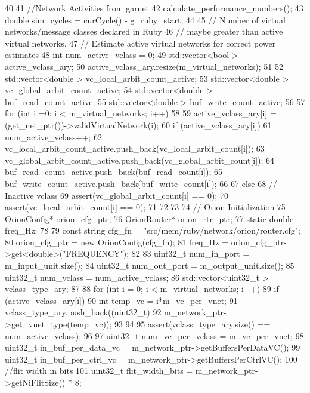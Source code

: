 \begin{DoxyCode}
40 {
41     //Network Activities from garnet
42     calculate_performance_numbers();
43     double sim_cycles = curCycle() - g_ruby_start;
44 
45     // Number of virtual networks/message classes declared in Ruby
46     // maybe greater than active virtual networks.
47     // Estimate active virtual networks for correct power estimates
48     int num_active_vclass = 0;
49     std::vector<bool > active_vclass_ary;
50     active_vclass_ary.resize(m_virtual_networks);
51 
52     std::vector<double > vc_local_arbit_count_active;
53     std::vector<double > vc_global_arbit_count_active;
54     std::vector<double > buf_read_count_active;
55     std::vector<double > buf_write_count_active;
56 
57     for (int i =0; i < m_virtual_networks; i++) {
58 
59         active_vclass_ary[i] = (get_net_ptr())->validVirtualNetwork(i);
60         if (active_vclass_ary[i]) {
61             num_active_vclass++;
62             vc_local_arbit_count_active.push_back(vc_local_arbit_count[i]);
63             vc_global_arbit_count_active.push_back(vc_global_arbit_count[i]);
64             buf_read_count_active.push_back(buf_read_count[i]);
65             buf_write_count_active.push_back(buf_write_count[i]);
66         }
67         else {
68             // Inactive vclass
69             assert(vc_global_arbit_count[i] == 0);
70             assert(vc_local_arbit_count[i] == 0);
71         }
72     }
73 
74     // Orion Initialization
75     OrionConfig* orion_cfg_ptr;
76     OrionRouter* orion_rtr_ptr;
77     static double freq_Hz;
78 
79     const string cfg_fn = "src/mem/ruby/network/orion/router.cfg";
80     orion_cfg_ptr = new OrionConfig(cfg_fn);
81     freq_Hz = orion_cfg_ptr->get<double>("FREQUENCY");
82 
83     uint32_t num_in_port = m_input_unit.size();
84     uint32_t num_out_port = m_output_unit.size();
85     uint32_t num_vclass = num_active_vclass;
86     std::vector<uint32_t > vclass_type_ary;
87 
88     for (int i = 0; i < m_virtual_networks; i++) {
89         if (active_vclass_ary[i]) {
90             int temp_vc = i*m_vc_per_vnet;
91             vclass_type_ary.push_back((uint32_t) 
92                 m_network_ptr->get_vnet_type(temp_vc));
93         }
94     }
95     assert(vclass_type_ary.size() == num_active_vclass);
96 
97     uint32_t num_vc_per_vclass = m_vc_per_vnet;
98     uint32_t in_buf_per_data_vc = m_network_ptr->getBuffersPerDataVC();
99     uint32_t in_buf_per_ctrl_vc = m_network_ptr->getBuffersPerCtrlVC();
100     //flit width in bits
101     uint32_t flit_width_bits = m_network_ptr->getNiFlitSize() * 8;
}
\end{DoxyCode}
